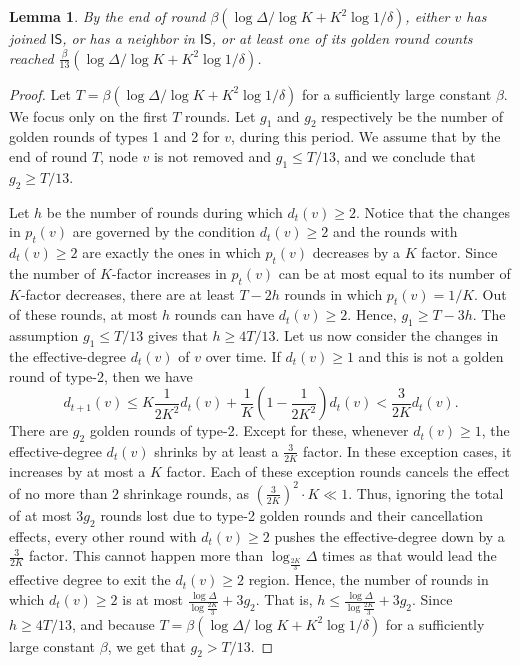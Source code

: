 \documentclass[11pt]{article}
\newtheorem{lemma}[theorem]{Lemma}
\begin{document}
\begin{lemma}\label{lem:goldCount} By the end of round $\beta(\log \Delta/\log K + K^2 \log 1/\delta)$, either $v$ has joined $\mathsf{IS}$, or has a neighbor in $\mathsf{IS}$, or at least one of its golden round counts reached $\frac{\beta}{13}(\log \Delta/\log K + K^2 \log 1/\delta)$.
\end{lemma}
\begin{proof} Let $T=\beta(\log\Delta/\log K + K^2 \log 1/\delta)$ for a sufficiently large constant $\beta$. We focus only on the first $T$ rounds. Let $g_1$ and $g_2$ respectively be the number of golden rounds of types 1 and 2 for $v$, during this period. We assume that by the end of round $T$, node $v$ is not removed and $g_1 \leq T/13$, and we conclude that $g_2 \geq T/13$.


Let $h$ be the number of rounds during which $d_{t}(v)\geq 2$. Notice that the changes in $p_{t}(v)$ are governed by the condition  $d_{t}(v)\geq 2$ and the rounds with $d_{t}(v)\geq 2$ are exactly the ones in which $p_{t}(v)$ decreases by a $K$ factor. Since the number of $K$-factor increases in $p_{t}(v)$ can be at most equal to its number of $K$-factor decreases, there are at least $T -2h$ rounds in which $p_{t}(v)=1/K$. Out of these rounds, at most $h$ rounds can have $d_{t}(v)\geq 2$. Hence, $g_1 \geq T -3h$. The assumption $g_1 \leq T/13$ gives that $h\geq 4T/13$. Let us now consider the changes in the effective-degree $d_{t}(v)$ of $v$ over time. If $d_{t}(v) \geq 1$ and this is not a golden round of type-2, then we have 
$$d_{t+1}(v) \leq K \frac{1}{2K^2} d_t(v)+ \frac{1}{K} (1-\frac{1}{2K^2}) d_{t}(v) < \frac{3}{2K} d_{t}(v).$$ 
There are $g_2$ golden rounds of type-2. Except for these, whenever $d_{t}(v)\geq 1$, the effective-degree $d_{t}(v)$ shrinks by at least a $\frac{3}{2K}$ factor. In these exception cases, it increases by at most a $K$ factor. Each of these exception rounds cancels the effect of no more than $2$ shrinkage rounds, as $(\frac{3}{2K})^2 \cdot K \ll 1$. Thus, ignoring the total of at most $3g_2$ rounds lost due to type-2 golden rounds and their cancellation effects, every other round with $d_{t}(v)\geq 2$ pushes the effective-degree down by a $\frac{3}{2K}$ factor. This cannot happen more than $\log_{\frac{2K}{3}}\Delta$ times as that would lead the effective degree to exit the $d_{t}(v)\geq 2$ region. Hence, the number of rounds in which $d_{t}(v)\geq 2$ is at most $\frac{\log\Delta}{\log \frac{2K}{3}} + 3g_2$. That is, $h \leq \frac{\log\Delta}{\log \frac{2K}{3}} + 3g_2$. Since $h\geq 4T/13$, and because $T=\beta(\log\Delta/\log K + K^2 \log 1/\delta)$ for a sufficiently large constant $\beta$, we get that $g_2 > T/13$.
\end{proof}
\end{document}
